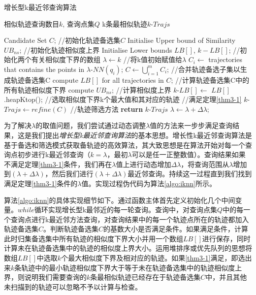 \begin{algorithm}
\caption{增长型k最近邻查询算法}
\label{algo:iknn}
\begin{algorithmic}[1] %
\Require 相似轨迹查询数目$k$, 查询点集$Q$ %
\Ensure k条最相似轨迹$k$-$Trajs$ %

\State Candidate Set $C$; //初始化轨迹备选集$C$
\State Initialise Upper bound of Similarity $UB_{ns}$; //初始化轨迹相似度上界
\State Initialise Lower bounds $LB[]$, $k-LB[]$; //初始化两个有关相似度下界的数组
\State $\lambda \gets k$ //将k值初始赋值给$\lambda$
		\State $C_{i}\gets$ trajectories that contains the points in $\lambda$-$NN(q_{i})$;
	\EndFor
	\State $C \gets\bigcup_{i=1}^{m}C_{i}$; //合并轨迹备选子集以生成轨迹备选集C
		\State compute $LB[]$ for all trajectories in $C$; //计算轨迹备选集C中的所有轨迹相似度下界
		\State compute $UB_{ns}$; //计算相似度上界
		\State $k$-$LB[]\gets$ $LB[]$.heapKtop(); //选取相似度下界k个最大值和其对应的轨迹
		 //满足定理\ref{thm3-1}
			\State $k$-$Trajs\gets refine(C)$ //轨迹筛选方法
			\State \textbf{return} $k$-$Trajs$ 
		\EndIf 
	\EndIf
	\State $\lambda\gets\lambda+\Delta\lambda$;
\EndWhile
\end{algorithmic}
\end{algorithm}


为了解决$\lambda$的取值问题，我们尝试通过动态调整$\lambda$值的方法来一步步满足查询结果，这是我们提出\emph{增长型k最近邻查询算法}的基本思想。增长性k最近邻查询算法是基于备选和筛选模式获取备轨迹的高效算法，其大致思想是在算法开始对每一个查询点初步进行k最近邻查询（$k=\lambda$，最初$\lambda$可以是任一正整数值）。查询结果如果不满足定理\ref{thm3-1}条件，我们再在$\lambda$值上进行动态增加$\Delta\lambda$，将查询范围从$\lambda$增加到$(\lambda+\Delta\lambda)$，然后我们进行$(\lambda+\Delta\lambda)$最近邻查询。持续这一过程直到我们找到满足定理\ref{thm3-1}条件的$\lambda$值。实现过程伪代码为算法\ref{algo:iknn}所示。


算法\ref{algo:iknn}的具体实现细节如下。通过函数主体首先定义初始化几个中间变量。$while$循环实现增长型k最邻近的每一轮查询。查询中，对查询点集$Q$中的每一个查询点进行k最近邻方法查询，对查询结果中的每一个轨迹点所在的轨迹都加入轨迹备选集$C$。判断轨迹备选集$C$的基数大小是否满足条件。如果满足条件，计算此时归集备选集中所有轨迹的相似度下界大小并用一个数组$LB[]$进行保存，同时计算未在轨迹备选集中的轨迹的相似度上界大小。运用堆排序或优先队列的思想将数组$LB[]$中选取$k$个最大相似度下界及相对应的轨迹。如果\ref{thm3-1}满足，即选出来$k$条轨迹中的最小轨迹相似度下界大于等于未在轨迹备选集中的轨迹相似度上界，则说明我们需要查询的$k$条最相似轨迹已经存在于轨迹备选集$C$中，并且其他未扫描到的轨迹可以忽略不予以计算与检查。
\\

